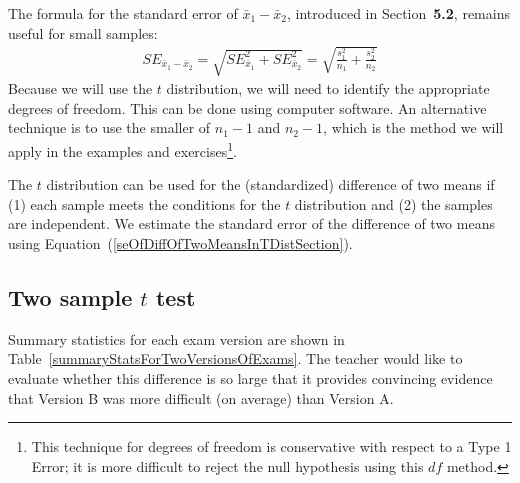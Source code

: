 The formula for the standard error of $\bar{x}_{1} - \bar{x}_{2}$, introduced in Section~\textbf{\color{red}5.2},
remains useful for small samples:
\begin{eqnarray}
SE_{\bar{x}_1 - \bar{x}_2}
	= \sqrt{SE_{\bar{x}_1}^2 + SE_{\bar{x}_2}^2}
	 = \sqrt{\frac{s_1^2}{n_1} + \frac{s_2^2}{n_2}} \label{seOfDiffOfTwoMeansInTDistSection}
\end{eqnarray}
Because we will use the $t$ distribution, we will need to identify the appropriate degrees of freedom. This can be done using computer software. An alternative technique is to use the smaller of $n_1 - 1$ and $n_2 - 1$, which is the method we will apply in the examples and exercises\footnote{This technique for degrees of freedom is conservative with respect to a Type 1 Error; it is more difficult to reject the null hypothesis using this $df$ method.}. 

\begin{termBox}{
The $t$ distribution can be used for the (standardized) difference of two means if (1) each sample meets the conditions for the $t$ distribution and (2) the samples are independent. We estimate the standard error of the difference of two means using Equation~(\ref{seOfDiffOfTwoMeansInTDistSection}).}
\end{termBox}


\subsection{Two sample $t$ test}

Summary statistics for each exam version are shown in Table~\ref{summaryStatsForTwoVersionsOfExams}. The teacher would like to evaluate whether this difference is so large that it provides convincing evidence that Version B was more difficult (on average) than Version A. 

